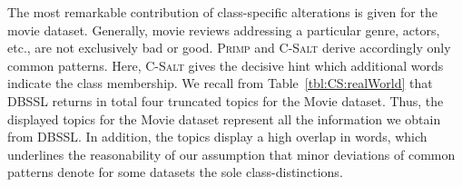 The most remarkable contribution of class-specific alterations is given for the movie dataset. Generally, movie reviews addressing a particular genre, actors, etc., are not exclusively bad or good. \textsc{Primp} and \textsc{C-Salt} derive accordingly only common patterns. Here, \textsc{C-Salt} gives the decisive hint which additional words indicate the class membership. We recall from Table~\ref{tbl:CS:realWorld} that \textsc{DBSSL} returns in total four truncated topics for the Movie dataset. Thus, the displayed topics for the Movie dataset represent all the information we obtain from \textsc{DBSSL}. In addition, the topics display a high overlap in words, which underlines the reasonability of our assumption that minor deviations of common patterns denote for some datasets the sole class-distinctions.  
